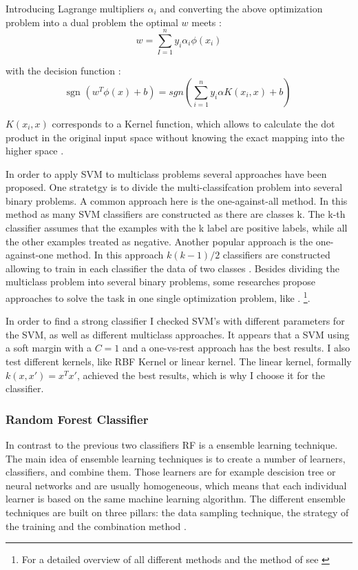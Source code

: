 \documentclass[12pt, a4paper, titlepage]{article}
\begin{document}
Introducing Lagrange multipliers $\alpha_i$ and converting the above optimization problem into a dual problem the optimal $w$ meets \citep{Chang2001, Jordan2006}:
\[w = \sum_{I=1}^n y_i\alpha_i\phi(x_i)\]

with the decision function \citep{Chang2001}:
\[\text{sgn } (w^T\phi(x)+b) = sgn(\sum_{i=1}^n y_i \alpha K(x_i, x) +b)\]

$K(x_i, x)$ corresponds to a Kernel function, which allows to calculate the dot product in the original input space without knowing the exact mapping into the higher space \citep{Han2012, Jordan2006}. 

In order to apply \ac{SVM} to multiclass problems several approaches have been proposed. One stratetgy is to divide the multi-classifcation problem into several binary problems. A common approach here is the one-against-all method. In this method as many \ac{SVM} classifiers are constructed as there are classes k. The k-th classifier assumes that the examples with the k label are positive labels, while all the other examples treated as negative. Another popular approach is the one-against-one method. In this approach $k(k-1)/2$ classifiers are constructed allowing to train in each classifier the data of two classes \citep{Hsu2002}. Besides dividing the multiclass problem into several binary problems, some researches propose approaches to solve the task in one single optimization problem, like \citet{Crammer2001}. \footnote{For a detailed overview of all different methods and the method of \citet{Crammer2001} see \citet{Hsu2002,Crammer2001}}. 

In order to find a strong classifier I checked \ac{SVM}'s with different parameters for the \ac{SVM}, as well as different multiclass approaches. It appears that a SVM using a soft margin with a $C=1$ and a one-vs-rest approach has the best results. I also test different kernels, like  RBF Kernel or linear kernel. The linear kernel, formally  $k(x, x') = x^Tx'$, achieved the best results, which is why I choose it for the classifier. 


\subsubsection{Random Forest Classifier}
In contrast to the previous two classifiers \ac{RF} is a ensemble learning technique. The main idea of ensemble learning techniques is to create a number of learners, classifiers, and combine them. Those learners are for example descision tree or neural networks and are usually homogeneous, which means that each individual learner is based on the same machine learning algorithm. The different ensemble techniques are built on three pillars: the data sampling technique, the strategy of the training and the combination method \cite{polikar2012, zhou2009}. 
\end{document}

